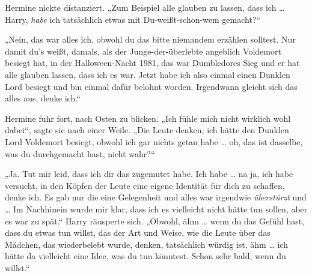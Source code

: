 Hermine nickte distanziert.
„Zum Beispiel alle glauben zu lassen, dass ich … Harry, \emph{habe} ich tatsächlich etwas mit Du-weißt-schon-wem gemacht?“

„Nein, das war alles ich, obwohl du das bitte niemandem erzählen solltest. Nur damit du’s weißt, damals, als der Junge-der-überlebte angeblich Voldemort besiegt hat, in der Halloween-Nacht 1981, das war Dumbledores Sieg und er hat alle glauben lassen, dass ich es war. Jetzt habe ich also einmal einen Dunklen Lord besiegt und bin einmal dafür belohnt worden. Irgendwann gleicht sich das alles aus, denke ich.“

Hermine fuhr fort, nach Osten zu blicken.
„Ich fühle mich nicht wirklich wohl dabei“, sagte sie nach einer Weile.
„Die Leute denken, ich hätte den Dunklen Lord Voldemort besiegt, obwohl ich gar nichts getan habe … oh, das ist dasselbe, was du durchgemacht hast, nicht wahr?“

„Ja. Tut mir leid, dass ich dir das zugemutet habe. Ich habe … na ja, ich habe versucht, in den Köpfen der Leute eine eigene Identität für dich zu schaffen, denke ich. Es gab nur die eine Gelegenheit und alles war irgendwie \emph{überstürzt} und … Im Nachhinein wurde mir klar, dass ich es vielleicht nicht hätte tun sollen, aber es war zu spät.“ Harry räusperte sich.
„Obwohl, ähm … wenn du das Gefühl hast, dass du etwas tun willst, das der Art und Weise, wie die Leute über das Mädchen, das wiederbelebt wurde, denken, tatsächlich würdig ist, ähm … ich hätte da vielleicht eine Idee, was du tun könntest. Schon sehr bald, wenn du willst.“

